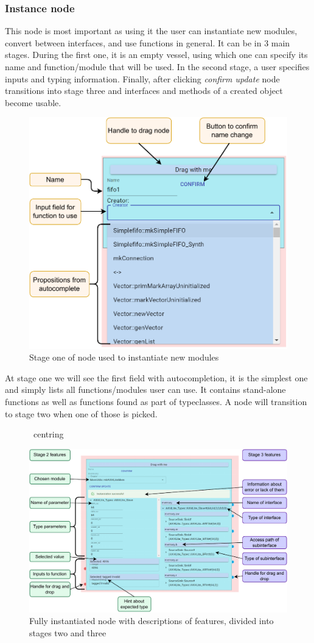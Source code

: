 \documentclass[12pt]{report}
\begin{document}
\subsubsection{Instance node} 
This node is most important as using it the user can instantiate new modules, convert between interfaces, and use functions in general. It can be in 3 main stages. During the first one, it is an empty vessel, using which one can specify its name and function/module that will be used. In the second stage, a user specifies inputs and typing information. Finally, after clicking \emph{confirm update} node transitions into stage three and interfaces and methods of a created object become usable. 
\newpage 
\begin{figure}[!h] 
   \centering 
    
   \includegraphics[width=0.63\columnwidth]{pdfExports/LargeMapInstanceNode.pdf} 
   \caption{Stage one of node used to instantiate new modules} 
\end{figure} 
At stage one we will see the first field with autocompletion, it is the simplest one and simply lists all functions/modules user can use. It contains stand-alone functions as well as functions found as part of typeclasses. A node will transition to stage two when one of those is picked. 
\begin{figure}[!h] 
   \ centring 
    
   \includegraphics[width=1\columnwidth]{pdfExports/LargeMap-InstanceNodePart2.drawio.pdf} 
   \caption{Fully instantiated node with descriptions of features, divided into stages two and three} 
\end{figure} 
\end{document}
